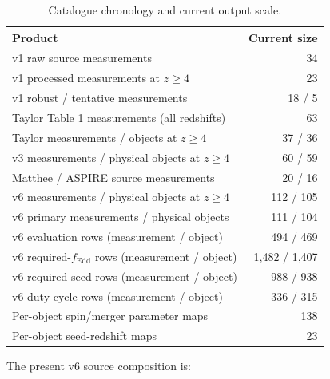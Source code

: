 \documentclass[11pt]{article}
\newcommand{\fedd}{f_{\mathrm{Edd}}}
\begin{document}
\begin{table}[ht]
\centering
\caption{Catalogue chronology and current output scale.}
\begin{tabular}{@{}lr@{}}
\toprule
Product & Current size \\
\midrule
v1 raw source measurements & 34 \\
v1 processed measurements at $z\geq4$ & 23 \\
v1 robust / tentative measurements & 18 / 5 \\
Taylor Table 1 measurements (all redshifts) & 63 \\
Taylor measurements / objects at $z\geq4$ & 37 / 36 \\
v3 measurements / physical objects at $z\geq4$ & 60 / 59 \\
Matthee / ASPIRE source measurements & 20 / 16 \\
v6 measurements / physical objects at $z\geq4$ & 112 / 105 \\
v6 primary measurements / physical objects & 111 / 104 \\
v6 evaluation rows (measurement / object) & 494 / 469 \\
v6 required-$\fedd$ rows (measurement / object) & 1,482 / 1,407 \\
v6 required-seed rows (measurement / object) & 988 / 938 \\
v6 duty-cycle rows (measurement / object) & 336 / 315 \\
Per-object spin/merger parameter maps & 138 \\
Per-object seed-redshift maps & 23 \\
\bottomrule
\end{tabular}
\end{table}

The present v6 source composition is:
\begin{table}[ht]
\centering
\caption{Measurement rows and preferred object-level rows by literature source.}
\small
{}
\end{table}
\end{document}
